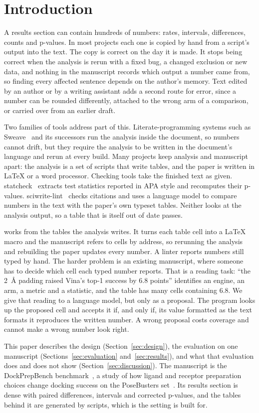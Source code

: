 \section{Introduction}
\label{sec:intro}

A results section can contain hundreds of numbers: rates, intervals, differences, counts and
p-values. In most projects each one is copied by hand from a script's output into the text. The
copy is correct on the day it is made. It stops being correct when the analysis is rerun with a
fixed bug, a changed exclusion or new data, and nothing in the manuscript records which output a
number came from, so finding every affected sentence depends on the author's memory. Text edited
by an author or by a writing assistant adds a second route for error, since a number can be
rounded differently, attached to the wrong arm of a comparison, or carried over from an earlier
draft.

Two families of tools address part of this. Literate-programming systems such as
Sweave~\cite{leisch2002sweave} and its successors run the analysis inside the document, so numbers
cannot drift, but they require the analysis to be written in the document's language and rerun at
every build. Many projects keep analysis and manuscript apart: the analysis is a set of scripts
that write tables, and the paper is written in LaTeX or a word processor. Checking tools take the
finished text as given. statcheck~\cite{nuijten2016prevalence} extracts test statistics reported
in APA style and recomputes their p-values. sciwrite-lint~\cite{samsonau2026sciwrite} checks
citations and uses a language model to compare numbers in the text with the paper's own typeset
tables. Neither looks at the analysis output, so a table that is itself out of date passes.

\pv{} works from the tables the analysis writes. It turns each table cell into a LaTeX macro and
the manuscript refers to cells by address, so rerunning the analysis and rebuilding the paper
updates every number. A linter reports numbers still typed by hand. The harder problem is an
existing manuscript, where someone has to decide which cell each typed number reports. That is a
reading task: ``the 2~\AA{} padding raised Vina's top-1 success by 6.8 points'' identifies an
engine, an arm, a metric and a statistic, and the table has many cells containing 6.8. We give
that reading to a language model, but only as a proposal. The program looks up the proposed cell
and accepts it if, and only if, its value formatted as the text formats it reproduces the written
number. A wrong proposal costs coverage and cannot make a wrong number look right.

This paper describes the design (Section~\ref{sec:design}), the evaluation on one manuscript
(Sections~\ref{sec:evaluation} and~\ref{sec:results}), and what that evaluation does and does not
show (Section~\ref{sec:discussion}). The manuscript is the DockPrepBench
benchmark~\cite{alobo2026dockprepbench}, a study of how ligand and receptor preparation choices
change docking success on the PoseBusters set~\cite{buttenschoen2024posebusters}. Its results
section is dense with paired differences, intervals and corrected p-values, and the tables behind
it are generated by scripts, which is the setting \pv{} is built for.
